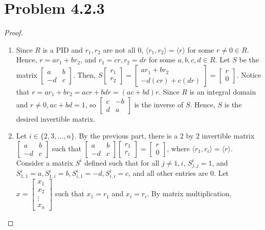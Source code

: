 \documentclass[12pt]{article}
\begin{document}
\section{Problem 4.2.3}

\begin{proof}
\begin{enumerate}
    \item Since $R$ is a PID and $r_1, r_2$ are not all $0$, $\langle r_1, r_2 \rangle = \langle r \rangle$ for some $r \neq 0 \in R$. Hence, $r = ar_1 + br_2$, and $r_1 = c r, r_2 = d r$ for some $a, b, c, d \in R$. Let $S$ be the matrix $\begin{bmatrix} a & b\\ -d & c \end{bmatrix}$. Then, $S\begin{bmatrix} r_1\\ r_2 \end{bmatrix} = \begin{bmatrix} ar_1+br_2\\ -d(cr)+c(dr) \end{bmatrix} = \begin{bmatrix} r \\ 0 \end{bmatrix}$. Notice that $r = ar_1 +br_2 = acr+bdr = (ac+bd)r$. Since $R$ is an integral domain and $r \neq 0, ac+bd=1$, so $\begin{bmatrix} c & -b\\ d & a \end{bmatrix}$ is the inverse of $S$. Hence, $S$ is the desired invertible matrix.
    \item Let $i \in \{2, 3, \ldots, n\}$. By the previous part, there is a $2$ by $2$ invertible matrix $\begin{bmatrix} a & b\\ -d & c \end{bmatrix}$ such that $\begin{bmatrix} a & b\\ -d & c \end{bmatrix} \begin{bmatrix} r_1\\ r_i \end{bmatrix} = \begin{bmatrix} r \\ 0 \end{bmatrix}$, where $\langle r_1, r_i \rangle = \langle r \rangle$. Consider a matrix $S^i$ defined such that for all $j \neq 1, i$, $S^i_{j, j} = 1$, and $S^i_{1,1} = a, S^i_{1,i} = b, S^i_{i,1} = -d, S^i_{i,i} = c$, and all other entries are $0$. Let $x =  \begin{bmatrix} x_1\\ x_2 \\ \vdots \\ x_n \end{bmatrix}$ such that $x_1=r_1$ and $x_i=r_i$. By matrix multiplication, 

\end{enumerate}
\end{proof}
\end{document}
